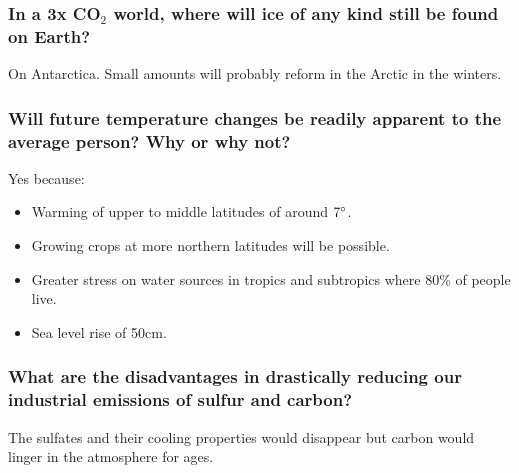 \subsubsection{In a 3x CO$_2$ world, where will ice of any kind still be found
on Earth?}
On Antarctica. Small amounts will probably reform in the Arctic in the winters.

\subsubsection{Will future temperature changes be readily apparent to the
average person? Why or why not?}
Yes because:
\begin{itemize}
	\item Warming of upper to middle latitudes of around $7 \degree$.
	\item Growing crops at more northern latitudes will be possible.
	\item Greater stress on water sources in tropics and subtropics where
	80\% of people live.
	\item Sea level rise of 50cm.
\end{itemize}

\subsubsection{What are the disadvantages in drastically reducing our
industrial emissions of sulfur and carbon?}

The sulfates and their cooling properties would disappear but carbon would
linger in the atmosphere for ages.
